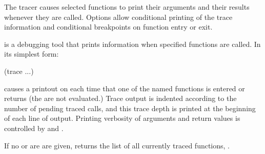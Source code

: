 The tracer causes selected functions to print their arguments and
their results whenever they are called.  Options allow conditional
printing of the trace information and conditional breakpoints on
function entry or exit.

 is a debugging tool that prints information when specified
functions are called.  In its simplest form:
\begin{example}
(trace   ...)
\end{example}
 causes a printout on  each time that one
of the named functions is entered or returns (the  are not
evaluated.)  Trace output is indented according to the number of pending
traced calls, and this trace depth is printed at the beginning of each
line of output.  Printing verbosity of arguments and return values is
controlled by  and .

If no  or  are are given,  returns the
list of all currently traced functions, .


